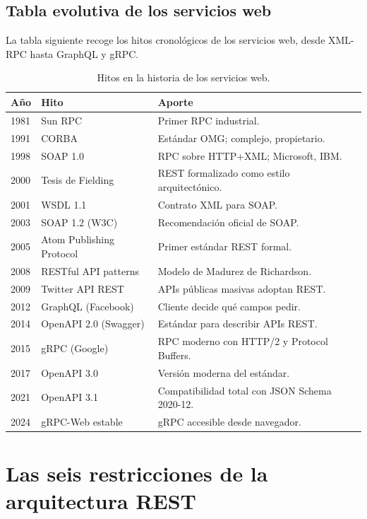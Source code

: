 \documentclass[11pt,a4paper,openany]{book}
\begin{document}
\subsection{Tabla evolutiva de los servicios web}

La tabla siguiente recoge los hitos cronológicos de los
servicios web, desde XML-RPC hasta GraphQL y gRPC.


\begin{table}[htbp]
\centering
\caption{Hitos en la historia de los servicios web.}
\footnotesize
\begin{tabularx}{\textwidth}{lll}
\toprule
\textbf{Año} & \textbf{Hito} & \textbf{Aporte}\\
\midrule
1981 & Sun RPC & Primer RPC industrial.\\
1991 & CORBA & Estándar OMG; complejo, propietario.\\
1998 & SOAP 1.0 & RPC sobre HTTP+XML; Microsoft, IBM.\\
2000 & Tesis de Fielding & REST formalizado como estilo arquitectónico.\\
2001 & WSDL 1.1 & Contrato XML para SOAP.\\
2003 & SOAP 1.2 (W3C) & Recomendación oficial de SOAP.\\
2005 & Atom Publishing Protocol & Primer estándar REST formal.\\
2008 & RESTful API patterns & Modelo de Madurez de Richardson.\\
2009 & Twitter API REST & APIs públicas masivas adoptan REST.\\
2012 & GraphQL (Facebook) & Cliente decide qué campos pedir.\\
2014 & OpenAPI 2.0 (Swagger) & Estándar para describir APIs REST.\\
2015 & gRPC (Google) & RPC moderno con HTTP/2 y Protocol Buffers.\\
2017 & OpenAPI 3.0 & Versión moderna del estándar.\\
2021 & OpenAPI 3.1 & Compatibilidad total con JSON Schema 2020-12.\\
2024 & gRPC-Web estable & gRPC accesible desde navegador.\\
\bottomrule
\end{tabularx}
\end{table}

\section{Las seis restricciones de la arquitectura REST}
\end{document}
